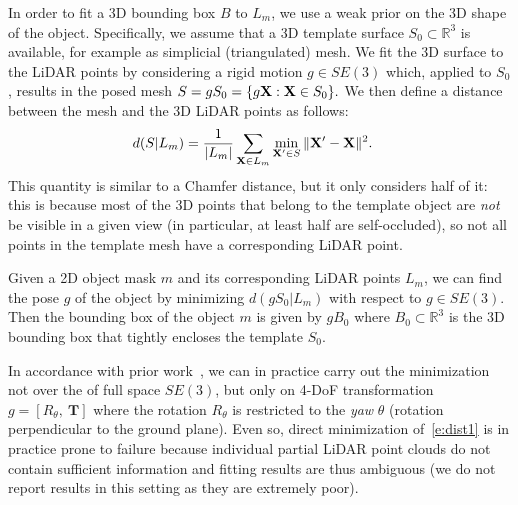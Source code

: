 

In order to fit a 3D bounding box $B$ to $L_m$, we use a weak prior on the 3D shape of the object.
Specifically, we assume that a 3D template surface $S_0\subset\mathbb{R}^3$ is available, for example as simplicial (triangulated) mesh.
We fit the 3D surface to the LiDAR points by considering a rigid motion $g \in SE(3)$ which, applied to $S_0$, results in the posed mesh
$
S = gS_0 = \{g\mathbf{X} : \mathbf{X} \in S_0\}.
$
We then define a distance between the mesh and the 3D LiDAR points as follows:
\begin{align}\label{e:dist1}
d(S|L_m)
&=
\frac{1}{|L_m|}
\sum_{\mathbf{X} \in L_m}
\min_{\mathbf{X}' \in S}
\|\mathbf{X}' - \mathbf{X} \|^2.
\end{align}
This quantity is similar to a Chamfer distance, but it only considers half of it:
this is because most of the 3D points that belong to the template object are \emph{not} be visible in a given view (in particular, at least half are self-occluded), so not all points in the template mesh have a corresponding LiDAR point.


Given a 2D object mask $m$ and its corresponding LiDAR points $L_m$, we can find the pose $g$ of the object by minimizing $d(g S_0|L_m)$ with respect to $g \in SE(3)$.
Then the bounding box of the object $m$ is given by $gB_0$ where $B_0 \subset \mathbb{R}^3$ is the 3D bounding box that tightly encloses the template $S_0$.

In accordance with prior work~\cite{geiger12are-we-ready,qin20weakly,meng2020ws3d}, we can in practice carry out the minimization not over the of full space $SE(3)$, but only on 4-DoF transformation $g = [R_\theta,~\mathbf{T}]$ where the rotation $R_\theta$ is restricted to the \emph{yaw} $\theta$ (rotation perpendicular to the ground plane).
Even so, direct minimization of~\cref{e:dist1} is in practice prone to failure because individual partial LiDAR point clouds do not contain sufficient information and fitting results are thus ambiguous (we do not report results in this setting as they are extremely poor).

